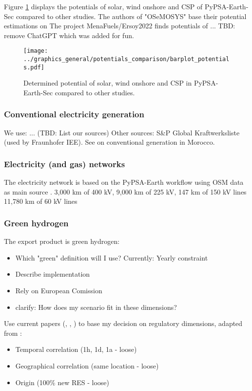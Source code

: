 Figure \ref{fig:potentials} displays the potentials of solar, wind onshore and CSP 
of PyPSA-Earth-Sec compared to other studies. The authors of "OSeMOSYS" 
\cite{Cannone2021} base their potential estimations on \cite[primary: 13,18,19]{Cannone2021}
The project MenaFuels/Ersoy2022 \cite{Ersoy2022} finds potentials of ...
TBD: remove ChatGPT which was added for fun.

\begin{figure}[h!]
    \centering
    \texttt{[image: ../graphics\_general/potentials\_comparison/barplot\_potentials.pdf]}
    \caption{Determined potential of solar, wind onshore and CSP in PyPSA-Earth-Sec compared to other studies.}
    \label{fig:potentials}
\end{figure}


\subsubsection{Conventional electricity generation}
We use: ... (TBD: List our sources)
Other sources: S\&P Global Kraftwerksliste (used by Fraunhofer IEE).
See \cite[p. 26]{Ersoy2022}  on conventional generation in Morocco.


\subsubsection{Electricity (and gas) networks}
The electricity network is based on the PyPSA-Earth workflow using OSM data as main source \cite{Parzen2022}.
3,000 km of 400 kV, 9,000 km of 225 kV, 147 km of 150 kV lines 
11,780 km of 60 kV lines \cite[p. 6, primary 44]{Boulakhbar2020}


\subsubsection{Green hydrogen}
The export product is green hydrogen:
\begin{itemize}
    \item Which "green" definition will I use? Currently: Yearly constraint
    \item Describe implementation
    \item Rely on European Comission
    \item clarify: How does my scenario fit in these dimensions?
\end{itemize}

Use current papers (\cite{Brauer2022}, \cite{Ruhnau2022}, \cite{Zeyen2022}) to base my decision on
regulatory dimensions, adapted from \cite{Brauer2022}:
\begin{itemize}
    \item Temporal correlation (1h, 1d, 1a - loose) 
    \item Geographical correlation (same location - loose)
    \item Origin (100\% new RES - loose)
\end{itemize}


